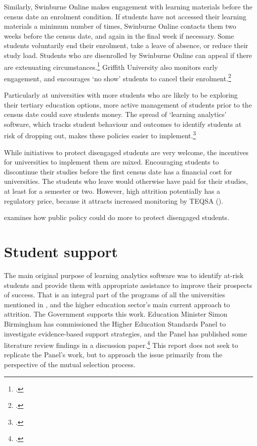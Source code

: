 Similarly, Swinburne Online makes engagement with learning materials before the census date an enrolment condition. If students have not accessed their learning materials a minimum number of times, Swinburne Online contacts them two weeks before the census date, and again in the final week if necessary. Some students voluntarily end their enrolment, take a leave of absence, or reduce their study load. Students who are disenrolled by Swinburne Online can appeal if there are extenuating circumstances.\footcite{OES2018} 
Griffith University also monitors early engagement, and encourages `no show' students to cancel their enrolment.\footcite{GriffithUniversity2017}

Particularly at universities with more students who are likely to be exploring their tertiary education options, more active management of students prior to the census date could save students money. The spread of `learning analytics' software, which tracks student behaviour and outcomes to identify students at risk of dropping out, makes these policies easier to implement.\footcites[][]{Dawson2016}[][]{West2015}

While initiatives to protect disengaged students are very welcome, the incentives for universities to implement them are mixed. Encouraging students to discontinue their studies before the first census date has a financial cost for universities. The students who leave would otherwise have paid for their studies, at least for a semester or two. However, high attrition potentially has a regulatory price, because it attracts increased monitoring by TEQSA ().

 examines how public policy could do more to protect disengaged students.


\section{Student support}\label{sec:6.3}

The main original purpose of learning analytics software was to identify at-risk students and provide them with appropriate assistance to improve their prospects of success. That is an integral part of the programs of all the universities mentioned in , and the higher education sector's main current approach to attrition. The Government supports this work. Education Minister Simon Birmingham has commissioned the Higher Education Standards Panel to investigate evidence-based support strategies, and the Panel has published some literature review findings in a discussion paper.\footcite[][p.~5, pp.~45--58]{HigherEducationStandardsPanel2017} This report does not seek to replicate the Panel's work, but to approach the issue primarily from the perspective of the mutual selection process.

